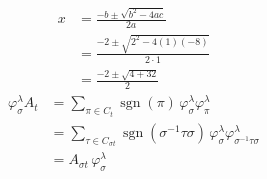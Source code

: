 \documentclass{article}
\begin{document}
\begin{align*}
x &= \frac{-b \pm \sqrt{b^2 - 4ac}}{2a} \\
&= \frac{-2 \pm \sqrt{2^2 - 4(1)(-8)}}{2 \cdot 1} \\
&= \frac{-2 \pm \sqrt{4 + 32}}{2}
\end{align*}
\begin{align*}
\varphi^\lambda_{\sigma} A_t
&= \sum_{\pi \in C_t} \operatorname{sgn}(\pi)\,
\varphi^\lambda_{\sigma}\varphi^\lambda_{\pi} \\
&= \sum_{\tau \in C_{\sigma t}}
\operatorname{sgn}(\sigma^{-1}\tau\sigma)\,
\varphi^\lambda_{\sigma}
\varphi^\lambda_{\sigma^{-1}\tau\sigma} \\
&= A_{\sigma t}\,\varphi^\lambda_{\sigma}
\end{align*}
\end{document}
